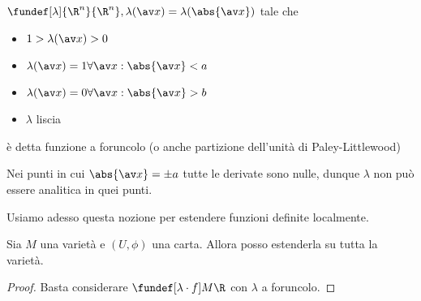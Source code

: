 

\begin{defn}
 $\fundef[\lambda] {\R^n}{\R^n}, \lambda(\av x) = \lambda(\abs{\av x})$ tale che 
 \begin{itemize}
  \item $1 > \lambda(\av x) > 0$
  \item $\lambda(\av x) = 1 \forall \av x: \abs{\av x} < a$
  \item $\lambda(\av x) = 0 \forall \av x: \abs{\av x} > b$
  \item $\lambda$ liscia
 \end{itemize}
 è detta funzione a foruncolo (o anche partizione dell'unità di Paley-Littlewood)
\end{defn}
\begin{oss}
 Nei punti in cui $\abs{\av x} = \pm a$ tutte le derivate sono nulle, dunque $\lambda$ non può essere analitica in quei punti.
\end{oss}
Usiamo adesso questa nozione per estendere funzioni definite localmente.
\begin{prop}
 Sia $M$ una varietà e $(U, \phi)$ una carta. Allora posso estenderla su tutta la varietà.
\end{prop}
 \begin{proof}
  Basta considerare $\fundef[\lambda\cdot f] M\R$ con $\lambda$ a foruncolo.
 \end{proof}
 
